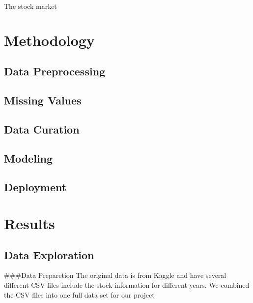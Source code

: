 \documentclass[11pt,]{article}
\begin{document}
The stock market

\hypertarget{methodology}{%
\section{Methodology}\label{methodology}}

\hypertarget{data-preprocessing}{%
\subsection{Data Preprocessing}\label{data-preprocessing}}

\hypertarget{missing-values}{%
\subsection{Missing Values}\label{missing-values}}

\hypertarget{data-curation}{%
\subsection{Data Curation}\label{data-curation}}

\hypertarget{modeling}{%
\subsection{Modeling}\label{modeling}}

\hypertarget{deployment}{%
\subsection{Deployment}\label{deployment}}

\hypertarget{results}{%
\section{Results}\label{results}}

\hypertarget{data-exploration}{%
\subsection{Data Exploration}\label{data-exploration}}

\#\#\#Data Preparetion The original data is from Kaggle and have several
different CSV files include the stock information for different years.
We combined the CSV files into one full data set for our project
\end{document}
